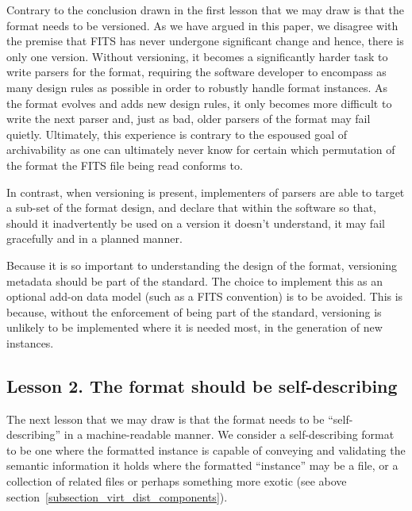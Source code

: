 \documentclass[final,authoryear,5p,times,twocolumn]{elsarticle}
\begin{document}
{{Contrary to the conclusion drawn in \citet{1997ASPC..125..257W}
the first lesson that we may draw is that the format needs to be
versioned.
As we have argued in this paper, we disagree with the premise
that FITS has never undergone significant change and hence, there
is only one version. Without versioning, it becomes a significantly
harder task to write parsers for the format, requiring the software
developer to encompass as many design rules as possible in order
to robustly handle format instances. As the format evolves and
adds new design rules, it only becomes more difficult to write the
next parser and, just as bad, older parsers of the format may fail quietly.
Ultimately, this experience is contrary to the espoused goal of
archivability as one can ultimately never know for certain which
permutation of the format the FITS file being read conforms to.


In contrast, when versioning is present, implementers of parsers
are able to target a sub-set of the format design, and declare
that within the software so that, should it inadvertently be used
on a version it doesn't understand, it may fail gracefully and
in a planned manner.


Because it is so important to understanding the design of
the format, versioning metadata should be part of the standard.
The choice to implement this as an optional add-on data model
(such as a FITS convention) is to be avoided. This is because,
without the enforcement of being part of the standard, versioning
is unlikely to be implemented where it is needed most, in the
generation of new instances.


\subsection{Lesson 2. The format should be self-describing}
\label{section_lesson_2}

The next lesson that we may draw is that the format needs to be
``self-describing'' in a machine-readable manner.
We consider a self-describing format to be one where the formatted
instance is capable of conveying and validating the semantic information
it holds where the formatted ``instance'' may be a file, or a
collection of related files or perhaps something more exotic
(see above section~\ref{subsection_virt_dist_components}).

}}
\end{document}
